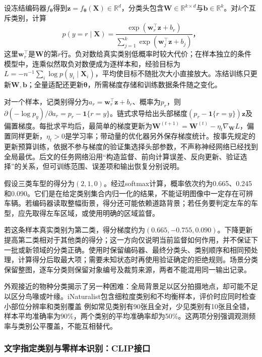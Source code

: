 设冻结编码器$f_{\bm{\theta}}$得到$\bm{z}=f_{\bm{\theta}}(\bm{X})\in\mathbb{R}^{d}$，分类头包含$\bm{W}\in\mathbb{R}^{k\times d}$与$\bm{b}\in\mathbb{R}^{k}$。对$k$个互斥类别，计算
\begin{equation}
 p(y=r\mid\bm{X})=
 \frac{\exp(\bm{w}_r^\top\bm{z}+b_r)}
 {\sum_{j=1}^{k}\exp(\bm{w}_j^\top\bm{z}+b_j)}\text{，}
 \label{eq:vision-linear-head}
\end{equation}
这里$\bm{w}_r^\top$是$\bm{W}$的第$r$行。负对数给真实类别低概率时较大代价；在样本独立的条件模型中，连乘似然取负对数便成为逐样本和，经验目标为$L=-n^{-1}\sum_i\log p(y_i\mid\bm X_i)$，平均使目标不随批次大小直接放大。冻结训练只更新$\bm{W},\bm{b}$；全量适配还更新$\bm{\theta}$，所需梯度存储和训练数据条件随之变化。

对一个样本，记类别得分为$a_r=\bm{w}_r^\top\bm{z}+b_r$、概率为$p_r$，则$\partial(-\log p_y)/\partial a_r=p_r-\mathbf{1}\{r=y\}$。链式求导给出头部梯度$(p_r-\mathbf{1}\{r=y\})\bm{z}$及偏置梯度。每批求平均后，最简单的梯度更新为$\bm{W}^{(t+1)}=\bm{W}^{(t)}-\eta_t\nabla_{\bm W}L$，偏置同样更新，$\eta_t>0$是学习率；带动量的优化器另外保存梯度统计。按事先规定的更新预算训练，依据不参与梯度的验证集选择头部参数，不声称神经网络已经找到全局最优。后文的任务网络沿用“构造监督、前向计算误差、反向更新、验证选择”的关系，但可训练范围、误差项和输出恢复分别说明。

假设三类车型的得分为$(2,1,0)$。经过softmax计算，概率依次约为0.665、0.245和0.090。它们是在给定类别集合内归一化的结果，不能证明图像中一定存在可辨车辆。若编码器读取整幅街景，得分还可能依赖道路背景；若任务要判定左车的车型，应先取得左车区域，或使用明确的区域监督。

若这条样本真实类别为第二类，得分梯度约为$(0.665,-0.755,0.090)$。下降更新提高第二类相对于其他类的得分；这一方向仅说明当前监督如何作用，并不保证下一批或新领域的分类正确。使用时保留编码器、最终分类头、类别顺序和相同预处理，计算得分后取最大项；需要未知状态时再使用验证确定的拒绝规则。场景分类保留整图，逐车分类则保留对象编号及裁剪来源，两者不能混用同一输出记录。

外观接近的物种分类揭示了另一种困难：全局背景足以区分拍摄地点，却可能不足以区分鸟喙或叶缘。iNaturalist包含细粒度类别和不均衡样本，评价时应同时检查小部位分辨率和类别覆盖
例如常见类别有90张且全对，少见类别有10张且全错，样本平均准确率为90\%，两个类别的平均准确率却为50\%。这两项分别强调观测频率与类别公平覆盖，不能互相替代。

\subsubsection{文字指定类别与零样本识别：CLIP接口}
\label{sec:vision-recognition-clip}

